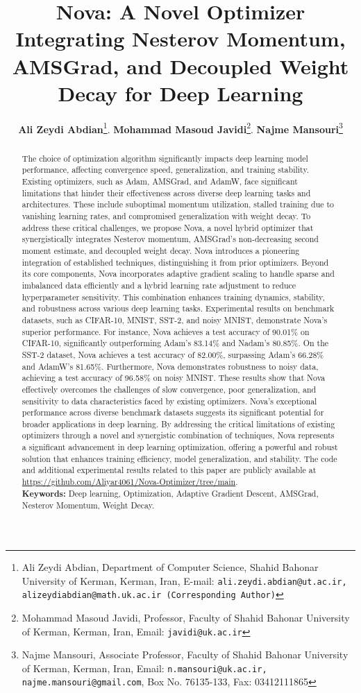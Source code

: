 \documentclass{article}
\date{}
\title{\bf{Nova: A Novel Optimizer Integrating Nesterov Momentum, AMSGrad, and Decoupled Weight Decay for Deep Learning
}}
\author{%
 \begin{tabular}{rl}
  {\bf Ali Zeydi Abdian}\thanks{Ali Zeydi Abdian, Department of Computer Science, Shahid Bahonar University of Kerman, Kerman, Iran,   E-mail: \texttt{ali.zeydi.abdian@ut.ac.ir, alizeydiabdian@math.uk.ac.ir (Corresponding Author)}}.  {\bf Mohammad Masoud Javidi}\thanks{Mohammad Masoud Javidi, Professor, Faculty of Shahid Bahonar University of Kerman, Kerman, Iran,  Email: \texttt{javidi@uk.ac.ir}}.  {\bf Najme Mansouri}\thanks{Najme Mansouri, Associate Professor, Faculty of Shahid Bahonar University of Kerman, Kerman, Iran, Email: \texttt{n.mansouri@uk.ac.ir, najme.mansouri@gmail.com}, Box No. 76135-133, Fax: 03412111865}
\end{tabular}
}
\begin{document}
\maketitle




\begin{abstract}
The choice of optimization algorithm significantly impacts deep learning model performance, affecting convergence speed, generalization, and training stability. Existing optimizers, such as Adam, AMSGrad, and AdamW, face significant limitations that hinder their effectiveness across diverse deep learning tasks and architectures. These include suboptimal momentum utilization, stalled training due to vanishing learning rates, and compromised generalization with weight decay. To address these critical challenges, we propose Nova, a novel hybrid optimizer that synergistically integrates Nesterov momentum, AMSGrad’s non-decreasing second moment estimate, and decoupled weight decay. Nova introduces a pioneering integration of established techniques, distinguishing it from prior optimizers. Beyond its core components, Nova incorporates adaptive gradient scaling to handle sparse and imbalanced data efficiently and a hybrid learning rate adjustment to reduce hyperparameter sensitivity. This combination enhances training dynamics, stability, and robustness across various deep learning tasks. Experimental results on benchmark datasets, such as CIFAR-10, MNIST, SST-2, and noisy MNIST, demonstrate Nova’s superior performance. For instance, Nova achieves a test accuracy of 90.01\% on CIFAR-10, significantly outperforming Adam’s 83.14\% and Nadam’s 80.85\%. On the SST-2 dataset, Nova achieves a test accuracy of 82.00\%, surpassing Adam's 66.28\% and AdamW's 81.65\%. Furthermore, Nova demonstrates robustness to noisy data, achieving a test accuracy of 96.58\% on noisy MNIST. These results show that Nova effectively overcomes the challenges of slow convergence, poor generalization, and sensitivity to data characteristics faced by existing optimizers. Nova’s exceptional performance across diverse benchmark datasets suggests its significant potential for broader applications in deep learning. By addressing the critical limitations of existing optimizers through a novel and synergistic combination of techniques, Nova represents a significant advancement in deep learning optimization, offering a powerful and robust solution that enhances training efficiency, model generalization, and stability. The code and additional experimental results related to this paper are publicly available at \url{https://github.com/Aliyar4061/Nova-Optimizer/tree/main}.\\

\noindent\textbf{Keywords:} Deep learning, Optimization, Adaptive Gradient Descent,  AMSGrad, Nesterov Momentum, Weight Decay.
\end{abstract}
\end{document}
